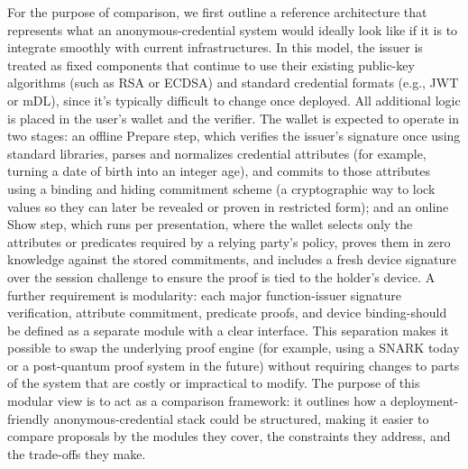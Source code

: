 For the purpose of comparison, we first outline a reference architecture that represents what an anonymous-credential system would ideally look like if it is to integrate smoothly with current infrastructures. In this model, the issuer is treated as fixed components that continue to use their existing public-key algorithms (such as RSA or ECDSA) and standard credential formats (e.g., JWT or mDL), since it's typically difficult to change once deployed. All additional logic is placed in the user’s wallet and the verifier.
The wallet is expected to operate in two stages: an offline Prepare step, which verifies the issuer’s signature once using standard libraries, parses and normalizes credential attributes (for example, turning a date of birth into an integer age), and commits to those attributes using a binding and hiding commitment scheme (a cryptographic way to lock values so they can later be revealed or proven in restricted form); and an online Show step, which runs per presentation, where the wallet selects only the attributes or predicates required by a relying party’s policy, proves them in zero knowledge against the stored commitments, and includes a fresh device signature over the session challenge to ensure the proof is tied to the holder’s device.
A further requirement is modularity: each major function-issuer signature verification, attribute commitment, predicate proofs, and device binding-should be defined as a separate module with a clear interface. This separation makes it possible to swap the underlying proof engine (for example, using a SNARK today or a post-quantum proof system in the future) without requiring changes to parts of the system that are costly or impractical to modify. The purpose of this modular view is to act as a comparison framework: it outlines how a deployment-friendly anonymous-credential stack could be structured, making it easier to compare proposals by the modules they cover, the constraints they address, and the trade-offs they make.

